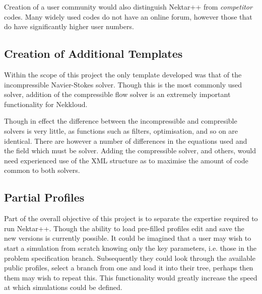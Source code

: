 \documentclass[11pt, a4paper]{report}
\begin{document}
Creation of a user community would also distinguish Nektar++ from \textit{competitor} codes. Many widely used codes do not have an online forum, however those that do have significantly higher user numbers.

\subsection{Creation of Additional Templates}
Within the scope of this project the only template developed was that of the incompressible Navier-Stokes solver. Though this is the most commonly used solver, addition of the compressible flow solver is an extremely important functionality for Nekkloud.

Though in effect the difference between the incompressible and compresible solvers is very little, as functions such as filters, optimisation, and so on are identical. There are however a number of differences in the equations used and the field which must be solver. Adding the compressible solver, and others, would need experienced use of the XML structure as to maximise the amount of code common to both solvers.

\subsection{Partial Profiles}
Part of the overall objective of this project is to separate the expertise required to run Nektar++. Though the ability to load pre-filled profiles edit and save the new versions is currently possible. It could be imagined that a user may wish to start a simulation from scratch knowing only the key parameters, i.e. those in the problem specification branch. Subsequently they could look through the available public profiles, select a branch from one and load it into their tree, perhaps then them may wish to repeat this. This functionality would greatly increase the speed at which simulations could be defined.

\newpage
%
\end{document}
